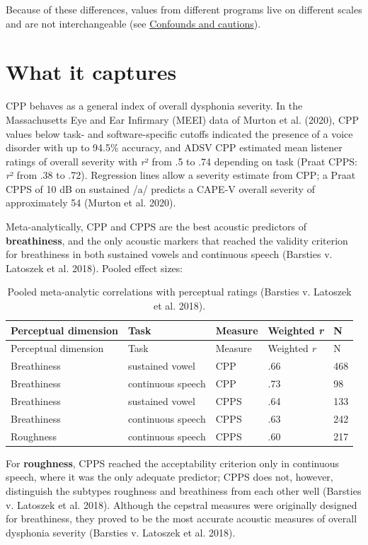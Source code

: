 \documentclass[
  english,
  letterpaper,
]{scrbook}
\begin{document}
Because of these differences, values from different programs live on
different scales and are not interchangeable (see
\hyperref[confounds-and-cautions]{Confounds and cautions}).

\section{What it captures}\label{what-it-captures}

CPP behaves as a general index of overall dysphonia severity. In the
Massachusetts Eye and Ear Infirmary (MEEI) data of Murton et al. (2020),
CPP values below task- and software-specific cutoffs indicated the
presence of a voice disorder with up to 94.5\% accuracy, and ADSV CPP
estimated mean listener ratings of overall severity with \emph{r}² from
.5 to .74 depending on task (Praat CPPS: \emph{r}² from .38 to .72).
Regression lines allow a severity estimate from CPP; a Praat CPPS of 10
dB on sustained /a/ predicts a CAPE-V overall severity of approximately
54 (Murton et al. 2020).

Meta-analytically, CPP and CPPS are the best acoustic predictors of
\textbf{breathiness}, and the only acoustic markers that reached the
validity criterion for breathiness in both sustained vowels and
continuous speech (Barsties v. Latoszek et al. 2018). Pooled effect
sizes:

\begin{longtable}[]{@{}lllll@{}}
\caption{Pooled meta-analytic correlations with perceptual ratings
(Barsties v. Latoszek et al. 2018).}\label{tbl-cpp-meta}\tabularnewline
\toprule\noalign{}
Perceptual dimension & Task & Measure & Weighted \emph{r} & N \\
\midrule\noalign{}
\endfirsthead
\toprule\noalign{}
Perceptual dimension & Task & Measure & Weighted \emph{r} & N \\
\midrule\noalign{}
\endhead
\bottomrule\noalign{}
\endlastfoot
Breathiness & sustained vowel & CPP & .66 & 468 \\
Breathiness & continuous speech & CPP & .73 & 98 \\
Breathiness & sustained vowel & CPPS & .64 & 133 \\
Breathiness & continuous speech & CPPS & .63 & 242 \\
Roughness & continuous speech & CPPS & .60 & 217 \\
\end{longtable}

For \textbf{roughness}, CPPS reached the acceptability criterion only in
continuous speech, where it was the only adequate predictor; CPPS does
not, however, distinguish the subtypes roughness and breathiness from
each other well (Barsties v. Latoszek et al. 2018). Although the
cepstral measures were originally designed for breathiness, they proved
to be the most accurate acoustic measures of overall dysphonia severity
(Barsties v. Latoszek et al. 2018).
\end{document}
